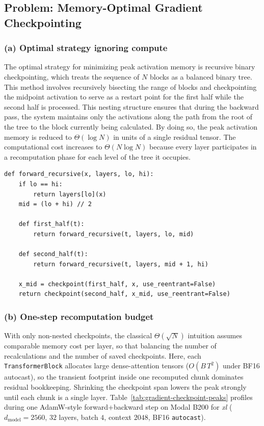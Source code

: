 \documentclass[11pt]{article}
\newcommand{\question}[1]{\subsection*{#1}}
\newcommand{\subquestion}[1]{\subsubsection*{#1}}
\begin{document}
\question{Problem: Memory-Optimal Gradient Checkpointing}
\subquestion{(a) Optimal strategy ignoring compute}
The optimal strategy for minimizing peak activation memory is recursive binary checkpointing, which treats the sequence of $N$ blocks as a balanced binary tree. This method involves recursively bisecting the range of blocks and checkpointing the midpoint activation to serve as a restart point for the first half while the second half is processed. This nesting structure ensures that during the backward pass, the system maintains only the activations along the path from the root of the tree to the block currently being calculated. By doing so, the peak activation memory is reduced to $\Theta(\log N)$ in units of a single residual tensor. The computational cost increases to $\Theta(N \log N)$ because every layer participates in a recomputation phase for each level of the tree it occupies.

\begin{verbatim}
def forward_recursive(x, layers, lo, hi):
    if lo == hi:
        return layers[lo](x)
    mid = (lo + hi) // 2

    def first_half(t):
        return forward_recursive(t, layers, lo, mid)

    def second_half(t):
        return forward_recursive(t, layers, mid + 1, hi)

    x_mid = checkpoint(first_half, x, use_reentrant=False)
    return checkpoint(second_half, x_mid, use_reentrant=False)
\end{verbatim}

\subquestion{(b) One-step recomputation budget}
With only non-nested checkpoints, the classical $\Theta(\sqrt{N})$ intuition assumes comparable memory cost per layer, so that balancing the number of recalculations and the number of saved checkpoints. Here, each \texttt{TransformerBlock} allocates large dense-attention tensors ($O(B\,T^2)$ under BF16 autocast), so the transient footprint inside one recomputed chunk dominates residual bookkeeping. Shrinking the checkpoint span lowers the peak strongly until each chunk is a single layer. Table~\ref{tab:gradient-checkpoint-peaks} profiles during one AdamW-style forward+backward step on Modal B200 for \emph{xl} ($d_{\mathrm{model}}{=}2560$, $32$ layers, batch $4$, context $2048$, BF16 \texttt{autocast}).

\begin{table}[H]
  \centering
  
  \caption{Peak allocated CUDA memory during one training-style step while varying contiguous layers wrapped per \texttt{checkpoint} call (non-nested). ``Vanilla'' uses no checkpointing; chunk size $32$ wraps the full stack once.}
  \label{tab:gradient-checkpoint-peaks}
\end{table}
\end{document}

